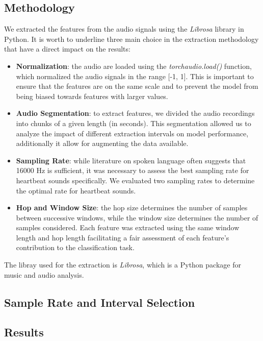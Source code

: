 \subsection{Methodology}
We extracted the features from the audio signals using the \textit{Librosa} library in Python. It is worth to underline three main choice in the extraction
methodology that have a direct impact on the results:
\begin{itemize}[leftmargin=*]
    \item \textbf{Normalization}: the audio are loaded using the \textit{torchaudio.load()} function, which normalized the audio signals in the range [-1, 1]. This is important to ensure that the features are on the same scale and to prevent the model from being biased towards features with larger values.
    \item \textbf{Audio Segmentation}: to extract features, we divided the audio recordings into chunks of a given length (in seconds). This segmentation allowed us to analyze the impact of different extraction intervals on model performance, additionally it allow for augmenting the data available. 
    \item \textbf{Sampling Rate}: while literature on spoken language often suggests that 16000 Hz is sufficient, it was necessary to assess the best sampling rate for heartbeat sounds specifically. We evaluated two sampling rates to determine the optimal rate for heartbeat sounds. 
    \item \textbf{Hop and Window Size}: the hop size determines the number of samples between successive windows, while the window size determines the number of samples considered. Each feature was extracted using the same window length and hop length facilitating a fair assessment of each feature's contribution to the classification task. 
\end{itemize}
The libray used for the extraction is \textit{Librosa}, which is a Python package for music and audio analysis. 

\subsection{Sample Rate and Interval Selection}

\subsection{Results}

